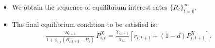 \documentclass{article}
\begin{document}
\begin{itemize}
    \item We obtain the sequence of equilibrium interest rates $\{ R_{t} \}_{t=0}^{\infty}$.


    \item The final equilibrium condition to be satisfied is:
    \begin{align}
         \frac{R_{t+1}}{1+\phi_{i,t}\left(B_{i,t+1}-\bar{B}_i\right)}\,P^X_{i,t}  = \frac{\chi_{i,t+1}}{\chi_{i,t}}\left[r_{i,t+1} + (1-d)P^X_{i,t+1}\right].
    \end{align}
\end{itemize}
\end{document}
